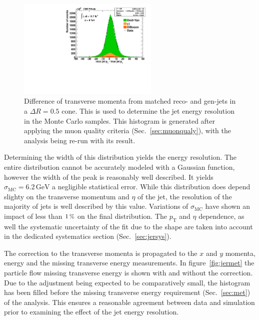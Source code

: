 \begin{figure}[htb!]
  \centering
  \includegraphics[width=0.6\textwidth]{plots/jer_deltapt.pdf}
  \caption{Difference of transverse momenta from matched reco- and gen-jets in a $\Delta R = 0.5$ cone. This is used to determine the jet energy resolution in the Monte Carlo samples. This histogram is generated after applying the muon quality criteria (Sec.~\ref{sec:muonqualy}), with the analysis being re-run with its result.}
  \label{fig:jerdeltapt}
\end{figure}

\noindent Determining the width of this distribution yields the energy resolution. The entire distribution cannot be accurately modeled with a Gaussian function, however the width of the peak is reasonably well described. It yields $\sigma_{\text{MC}} = 6.2\,\text{GeV}$ a negligible statistical error. While this distribution does depend slighty on the transverse momentum and $\eta$ of the jet, the resolution of the majority of jets is well described by this value. Variations of $\sigma_{\text{MC}}$ have shown an impact of less than $1\,\pct$ on the final distribution. The $p_{\text{T}}$ and $\eta$ dependence, as well the systematic uncertainty of the fit due to the shape are taken into account in the dedicated systematics section (Sec.~\ref{sec:jersys}).

The correction to the transverse momenta is propagated to the $x$ and $y$ momenta, energy and the missing transverse energy measurements. In figure~\ref{fig:jermet} the particle flow missing transverse energy is shown with and without the correction. Due to the adjustment being expected to be comparatively small, the histogram has been filled before the missing transverse energy requirement (Sec.~\ref{sec:met}) of the analysis. This ensures a reasonable agreement between data and simulation prior to examining the effect of the jet energy resolution.


